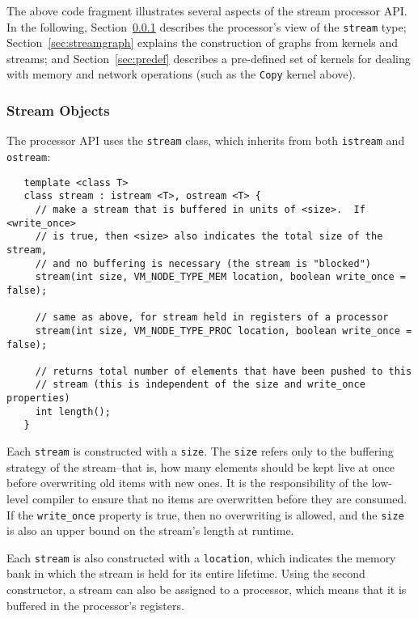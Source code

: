 The above code fragment illustrates several aspects of the stream
processor API.  In the following, Section~\ref{sec:procstreams}
describes the processor's view of the {\tt stream} type;
Section~\ref{sec:streamgraph} explains the construction of graphs from
kernels and streams; and Section~\ref{sec:predef} describes a
pre-defined set of kernels for dealing with memory and network
operations (such as the {\tt Copy} kernel above).

\subsubsection{Stream Objects}
\label{sec:procstreams}

The processor API uses the {\tt stream} class, which inherits from
both {\tt istream} and {\tt ostream}:
\begin{verbatim}
   template <class T> 
   class stream : istream <T>, ostream <T> {
     // make a stream that is buffered in units of <size>.  If <write_once>
     // is true, then <size> also indicates the total size of the stream,
     // and no buffering is necessary (the stream is "blocked")
     stream(int size, VM_NODE_TYPE_MEM location, boolean write_once = false);

     // same as above, for stream held in registers of a processor
     stream(int size, VM_NODE_TYPE_PROC location, boolean write_once = false);

     // returns total number of elements that have been pushed to this
     // stream (this is independent of the size and write_once properties)
     int length();
   }  
\end{verbatim}

Each {\tt stream} is constructed with a {\tt size}.  The {\tt size}
refers only to the buffering strategy of the stream--that is, how many
elements should be kept live at once before overwriting old items with
new ones.  It is the responsibility of the low-level compiler to
ensure that no items are overwritten before they are consumed.  If the
{\tt write\_once} property is true, then no overwriting is allowed,
and the {\tt size} is also an upper bound on the stream's length at
runtime.

Each {\tt stream} is also constructed with a {\tt location}, which
indicates the memory bank in which the stream is held for its entire
lifetime.  Using the second constructor, a stream can also be assigned
to a processor, which means that it is buffered in the processor's
registers.

